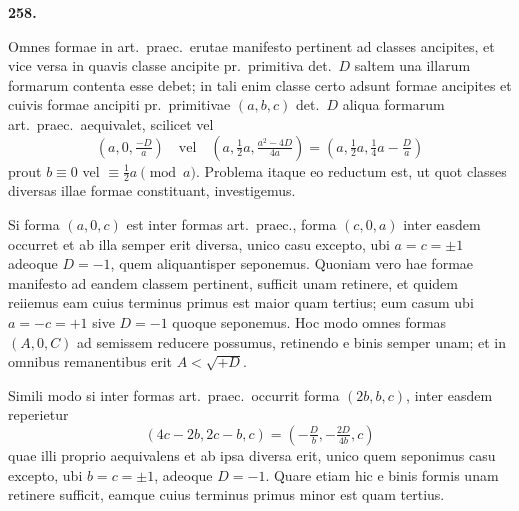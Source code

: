 \documentclass[12pt,a4paper]{article}
\theoremstyle{plain}
\theoremstyle{definition}
\theoremstyle{remark}
\begin{document}
\begin{center}\textbf{258.}\end{center}

Omnes formae in art.\ praec.\ erutae manifesto pertinent ad classes ancipites, et vice versa in quavis classe ancipite pr.\ primitiva det.\ $D$ saltem una illarum formarum contenta esse debet; in tali enim classe certo adsunt formae ancipites et cuivis formae ancipiti pr.\ primitivae $(a, b, c)$ det.\ $D$ aliqua formarum art.\ praec.\ aequivalet, scilicet vel
\[
(a, 0, \tfrac{-D}{a}) \quad \text{vel} \quad (a, \tfrac{1}{2}a, \tfrac{a^{2} - 4D}{4a}) = (a, \tfrac{1}{2}a, \tfrac{1}{4}a - \tfrac{D}{a})
\]
prout $b \equiv 0$ vel $\equiv \tfrac{1}{2}a \pmod{a}$. Problema itaque eo reductum est, ut quot classes diversas illae formae constituant, investigemus.

Si forma $(a, 0, c)$ est inter formas art.\ praec., forma $(c, 0, a)$ inter easdem occurret et ab illa semper erit diversa, unico casu excepto, ubi $a = c = \pm 1$ adeoque $D = -1$, quem aliquantisper seponemus. Quoniam vero hae formae manifesto ad eandem classem pertinent, sufficit unam retinere, et quidem reiiemus eam cuius terminus primus est maior quam tertius; eum casum ubi $a = -c = +1$ sive $D = -1$ quoque seponemus. Hoc modo omnes formas $(A, 0, C)$ ad semissem reducere possumus, retinendo e binis semper unam; et in omnibus remanentibus erit $A < \sqrt{+D}$.

Simili modo si inter formas art.\ praec.\ occurrit forma $(2b, b, c)$, inter easdem reperietur
\[
(4c - 2b, 2c - b, c) = (-\tfrac{D}{b}, -\tfrac{2D}{4b}, c)
\]
quae illi proprio aequivalens et ab ipsa diversa erit, unico quem seponimus casu excepto, ubi $b = c = \pm 1$, adeoque $D = -1$. Quare etiam hic e binis formis unam retinere sufficit, eamque cuius terminus primus minor est quam tertius.
\end{document}
